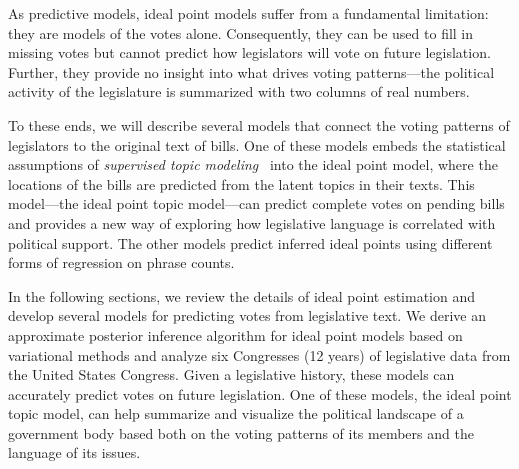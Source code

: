 
As predictive models, ideal point models suffer from a
fundamental limitation: they are models of the votes alone.
Consequently, they can be used to fill in missing votes but cannot
predict how legislators will vote on future legislation.  Further,
they provide no insight into what drives voting patterns---the
political activity of the legislature is summarized with two columns
of real numbers.

To these ends, we will describe several models that connect the voting
patterns of legislators to the original text of bills.  One of these
models embeds the statistical assumptions of \textit{supervised topic
  modeling}~\cite{blei:2008} into the ideal point model, where the
locations of the bills are predicted from the latent topics in their
texts. This model---the ideal point topic model---can predict complete
votes on pending bills and provides a new way of exploring how
legislative language is correlated with political support.  The other
models predict inferred ideal points using different forms of
regression on phrase counts.

In the following sections, we review the details of ideal point
estimation and develop several models for predicting votes from
legislative text.  We derive an approximate posterior inference
algorithm for ideal point models based on variational methods and
analyze six Congresses (12 years) of legislative data from the United
States Congress.  Given a legislative history, these models can
accurately predict votes on future legislation.  One of these models,
the ideal point topic model, can help summarize and visualize the
political landscape of a government body based both on the voting
patterns of its members and the language of its issues.

